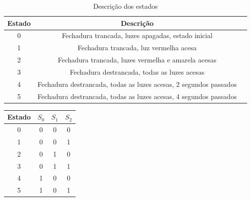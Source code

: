 \documentclass[12pt,a4paper]{article}
\begin{document}
\begin{table}[hb]
\begin{center}
\begin{tabular}{c|c|c}
\textbf{Estado} & \textbf{Descrição}\\ \hline
0 & Fechadura trancada, luzes apagadas, estado inicial \\
1 & Fechadura trancada, luz vermelha acesa \\
2 & Fechadura trancada, luzes vermelha e amarela acesas \\
3 & Fechadura destrancada, todas as luzes acesas \\
4 & Fechadura destrancada, todas as luzes acesas, 2 segundos passados \\
5 & Fechadura destrancada, todas as luzes acesas, 4 segundos passados \\ 
\hline
\end{tabular}
\end{center}
\caption{Descrição dos estados}
\label{tab2}
\end{table}


\begin{table}[!h]
\begin{tabular}{c|ccc}
Estado & $S_0$ & $S_1$ & $S_2$ \\ \hline
0 & 0 & 0 & 0 \\
1 & 0 & 0 & 1 \\
2 & 0 & 1 & 0 \\
3 & 0 & 1 & 1 \\
4 & 1 & 0 & 0 \\
5 & 1 & 0 & 1 \\
\end{tabular}
\label{tab3}
\end{table}

\end{document}
